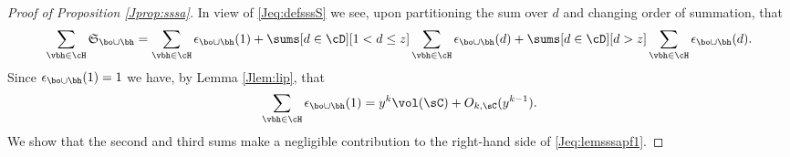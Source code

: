 \documentclass[12pt, reqno, twoside, letterpaper]{amsart}
\begin{document}
\begin{jetsam}
\begin{proof}[Proof of Proposition \ref{Jprop:sssa}]
In view of \eqref{Jeq:defsssS} we see, upon partitioning the sum 
over $d$ and changing order of summation, that  
\begin{equation}
 \label{Jeq:lemsssapf1}
 \sum_{\vbh \in \cH} \mathfrak{S}_{\bo \cup \bh}
  =
   \sum_{\vbh \in \cH} \epsilon_{\bo \cup \bh}(1)
    +
      \sums[d \in \cD][1 < d \le z]
       \sum_{\vbh \in \cH} \epsilon_{\bo \cup \bh}(d)
      +
       \sums[d \in \cD][d > z]
        \sum_{\vbh \in \cH} \epsilon_{\bo \cup \bh}(d).
\end{equation}
%
Since $\epsilon_{\bo \cup \bh}(1) = 1$ we have, by 
Lemma \ref{Jlem:lip}, that 
\begin{equation}
 \label{Jeq:volH}
  \sum_{\vbh \in \cH} \epsilon_{\bo \cup \bh}(1)
   =
    y^k \vol(\sC) + O_{k,\sC}(y^{k - 1}).
\end{equation}
%
We show that the second and third sums make a negligible 
contribution to the right-hand side of \eqref{Jeq:lemsssapf1}.


\end{proof}
\end{jetsam}
\end{document}
